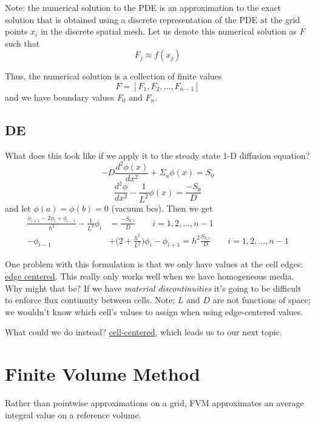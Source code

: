 \documentclass[12pt]{article}
\begin{document}
Note: the numerical solution to the PDE is an approximation to the exact solution that is obtained using a discrete representation of the PDE at the grid points $x_i$ in the discrete spatial mesh. Let us denote this numerical solution as $F$ such that 
$$F_j \approx f(x_j)$$ 

Thus, the numerical solution is a collection of finite values
$$F = [F_1, F_2, \dots, F_{n-1}]$$
and we have boundary values $F_0$ and $F_n$.


\subsection{DE}
What does this look like if we apply it to the steady state 1-D diffusion equation?
\[-D\frac{d^2 \phi(x)}{dx^2} + \Sigma_a \phi(x) = S_0\]
\[\frac{d^2 \phi}{dx^2} - \frac{1}{L^2}\phi(x) = \frac{-S_0}{D}\]
and let $\phi(a) = \phi(b) = 0$ (vacuum bcs). Then we get
\begin{align}
\frac{\phi_{i+1} - 2\phi_i + \phi_{i-1}}{h^2} - \frac{1}{L^2}\phi_i &= \frac{-S_{0,i}}{D} \qquad i = 1, 2, \dots, n-1 \nonumber \\
%
-\phi_{i-1} &+ \bigl(2 + \frac{h^2}{L^2}\bigr)\phi_i - \phi_{i+1} = h^2 \frac{S_{0,i}}{D} \qquad i = 1, 2, \dots, n-1 \nonumber
\end{align}

One problem with this formulation is that we only have values at the cell edges: \underline{edge centered}. This really only works well when we have homogeneous media. Why might that be? If we have \textit{material discontinuities} it's going to be difficult to enforce flux continuity between cells. Note: $L$ and $D$ are not functions of space; we wouldn't know which cell's values to assign when using edge-centered values. 

What could we do instead? \underline{cell-centered}, which leads us to our next topic.


\section{Finite Volume Method}
Rather than pointwise approximations on a grid, FVM approximates an average integral value on a reference volume.

%
\begin{center}
\end{center}
\end{document}
